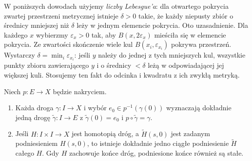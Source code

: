 W poniższych dowodach użyjemy \emph{liczby Lebesgue'a}:
dla otwartego pokrycia zwartej przestrzeni metrycznej istnieje
$\delta>0$ takie, że każdy niepusty zbiór o średnicy mniejszej
niż $\delta$ leży w jednym elemencie pokrycia.
Oto uzasadnienie. Dla każdego $x$ wybierzmy $\varepsilon_x>0$
tak, aby $B(x,2\varepsilon_x)$ mieściła się w elemencie pokrycia.
Ze zwartości skończenie wiele kul $B(x_i,\varepsilon_{x_i})$
pokrywa przestrzeń. Wystarczy $\delta=\min_i\varepsilon_{x_i}$:
jeśli $y$ należy do jednej z tych mniejszych kul, wszystkie
punkty zbioru zawierającego $y$ i o średnicy $<\delta$
leżą w odpowiadającej jej większej kuli. Stosujemy ten fakt
do odcinka i kwadratu z ich zwykłą metryką.

\begin{twierdzenie}
\label{thm:podnoszenie-nakrycie}
Niech $p:E\to X$ będzie nakryciem.
\begin{enumerate}[label=(\alph*),leftmargin=*]
\item Każda droga $\gamma:I\to X$ i wybór
      $e_0\in p^{-1}(\gamma(0))$ wyznaczają
      dokładnie jedną drogę
      $\widetilde\gamma:I\to E$ z
      $\widetilde\gamma(0)=e_0$ i
      $p\circ\widetilde\gamma=\gamma$.
\item Jeśli $H:I\times I\to X$ jest
      homotopią dróg, a $\widetilde H(s,0)$
      jest zadanym podniesieniem $H(s,0)$,
      to istnieje dokładnie jedno ciągłe
      podniesienie $\widetilde H$ całego $H$.
      Gdy $H$ zachowuje końce dróg,
      podniesione końce również są stałe.
\end{enumerate}
\end{twierdzenie}
